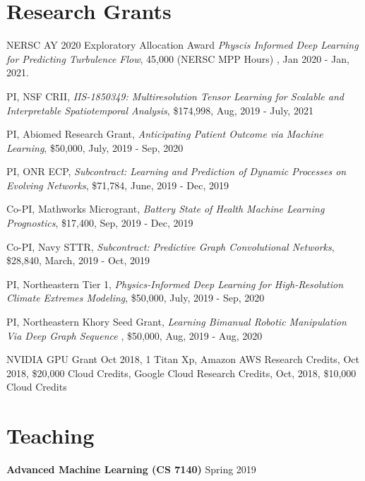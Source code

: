 \documentclass[margin,line]{res}
\begin{document}
\begin{resume}
\section{\sc Research Grants}
\begin{enumerate}[label={[G\arabic*]}]
\item NERSC AY 2020 Exploratory Allocation Award \textit{Physcis Informed Deep Learning for Predicting Turbulence Flow}, 45,000  (NERSC MPP Hours) , Jan 2020 - Jan, 2021.


\item  PI, {NSF CRII},    \textit{IIS-1850349: Multiresolution Tensor Learning for Scalable and Interpretable Spatiotemporal Analysis},    \$174,998,  Aug, 2019 - July, 2021

\item PI, {Abiomed Research Grant},    \textit{Anticipating Patient Outcome via Machine Learning}, \$50,000, July, 2019 - Sep, 2020

\item PI,  {ONR ECP}, \textit{Subcontract: Learning and Prediction of Dynamic Processes on Evolving Networks}, \$71,784, June, 2019 - Dec, 2019


\item Co-PI,  {Mathworks Microgrant},    \textit{Battery State of Health Machine Learning Prognostics}, \$17,400,  Sep, 2019 - Dec, 2019
 
\item Co-PI,  { Navy STTR}, \textit{ Subcontract: Predictive Graph Convolutional Networks}, \$28,840,  March, 2019 - Oct, 2019	

\item PI,  Northeastern Tier 1, \textit{Physics-Informed Deep Learning for High-Resolution Climate Extremes Modeling}, \$50,000, July, 2019 - Sep, 2020

\item PI, Northeastern Khory Seed Grant, \textit{Learning Bimanual Robotic Manipulation Via Deep Graph Sequence }, \$50,000,  Aug, 2019 - Aug, 2020	

\item NVIDIA GPU Grant Oct 2018, 1  Titan Xp,  Amazon AWS Research Credits, Oct  2018, \$20,000 Cloud Credits, Google Cloud Research Credits, Oct, 2018, \$10,000 Cloud Credits

\end{enumerate} 





 

\section{\sc Teaching }
 {\bf Advanced Machine Learning  (CS 7140)}   \hfill  { Spring 2019} 



\end{resume}
\end{document}
